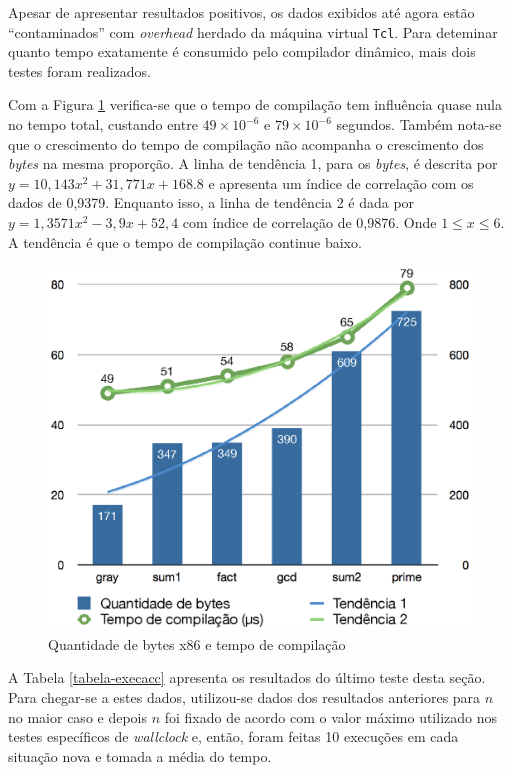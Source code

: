 Apesar de apresentar resultados positivos, os dados exibidos até
agora estão ``contaminados'' com \textit{overhead} herdado da
máquina virtual \texttt{Tcl}. Para deteminar quanto tempo exatamente
é consumido pelo compilador dinâmico, mais dois testes foram
realizados.

Com a Figura \ref{fig:tempo-compilacao} verifica-se que o tempo de
compilação tem influência quase nula no tempo total, custando entre
$49 \times 10^{-6}$ e $79 \times 10^{-6}$ segundos. Também nota-se que
o crescimento do tempo de compilação não acompanha o crescimento dos
\textit{bytes} na mesma proporção.
A linha de tendência 1, para os \textit{bytes}, é
descrita por $y = 10,143x^2 + 31,771x + 168.8$ e apresenta um índice
de correlação com os dados de 0,9379. Enquanto isso, a linha de
tendência 2 é dada por $y = 1,3571x^2 - 3,9x + 52,4$ com índice de
correlação de 0,9876. Onde $1 \le x \le 6$. A tendência é que o tempo
de compilação continue baixo.

\begin{figure}[ht]
  \centering
  \includegraphics[scale=0.71]{figs/tempo_compilacao}
  \caption{Quantidade de bytes x86 e tempo de compilação \label{fig:tempo-compilacao}}
\end{figure}

A Tabela \ref{tabela-execacc} apresenta os resultados do último teste
desta seção. Para chegar-se a estes dados, utilizou-se dados dos
resultados anteriores para $n$ no maior caso e depois $n$ foi fixado
de acordo com o valor máximo utilizado nos testes específicos de
\textit{wallclock} e, então, foram feitas 10 execuções em cada
situação nova e tomada a média do tempo.

